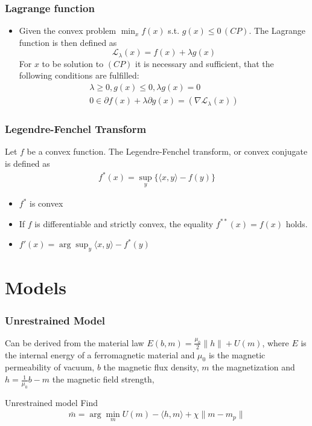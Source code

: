 \documentclass[utf8,aspectratio=169,ngerman,english]{beamer}
\begin{document}
\begin{frame}
\frametitle{Lagrange function \cite{rockafellar1997convex}}
 \begin{itemize}
    \item Given the convex problem $\min_x f(x)$ s.t. $g(x) \leq 0 \,(CP)$. The Lagrange function is then defined as
    \begin{equation}
    \mathcal L_\lambda(x) = f(x) + \lambda g(x)
    \end{equation}
    For $x$ to be solution to $(CP)$ it is necessary and sufficient, that the following conditions are fulfilled:
    \begin{align}
        \lambda \geq 0, g(x) \leq 0, \lambda g(x) = 0 \\
        0 \in \partial f(x) + \lambda \partial g(x) = (\nabla \mathcal L_\lambda(x))
    \end{align}
 \end{itemize} 


\end{frame}

\begin{frame} 
 \frametitle{Legendre-Fenchel Transform \cite{doi:10.1137/1.9781611974997}}
 Let $f$ be a convex function. The Legendre-Fenchel transform, or convex conjugate is defined as
 \begin{align}
  f^*(x) =  \sup_y\{\langle x, y\rangle - f(y) \}
 \end{align}
 \begin{itemize}
  \item $f^*$ is convex
  \item If $f$ is differentiable and strictly convex, the equality $f^{**}(x) = f(x)$ holds.
  \item $f'(x) = \arg \sup_y \langle x,y \rangle - f^*(y)$
 \end{itemize} 


\end{frame}

\section{Models}
\begin{frame}
\frametitle{Unrestrained Model \cite{inproceedings}}
Can be derived from the material law $E(b,m) = \frac{\mu_0}{2} \|h\| + U(m)$, where $E$ is the internal energy
of a ferromagnetic material and $\mu_0$ is the magnetic permeability of vacuum,
$b$ the magnetic flux density, $m$ the magnetization and $h = \frac{1}{\mu_0}b - m$ the magnetic field strength,
\begin{block}{Unrestrained model}
Find
 \begin{align}
  \bar m = \arg \min_m U(m) - \langle h , m \rangle + \chi \|m - m_p\|
 \end{align}
\end{block}
\end{frame}
\end{document}
